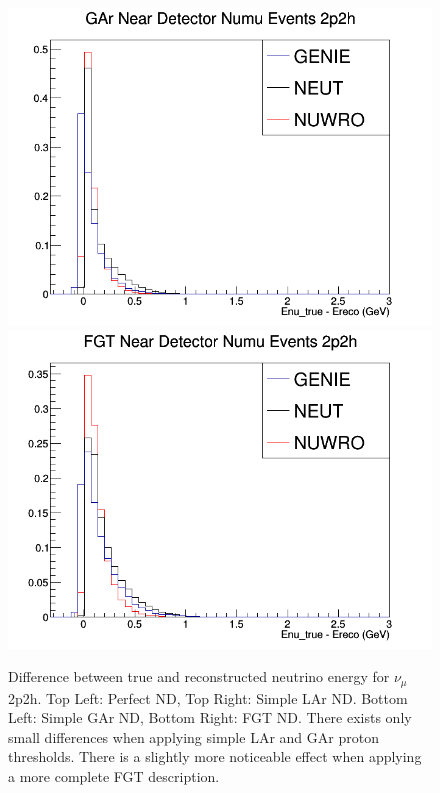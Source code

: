 \documentclass[12pt]{article}
\begin{document}
\begin{figure}[h]
\endminipage
\newline
{}
\includegraphics[width=\linewidth]{Ereco_Etrue/numu_GAr_2p2h.png}
\endminipage
{}
\includegraphics[width=\linewidth]{Ereco_Etrue/numu_FGT_2p2h.png}
\endminipage
\caption{Difference between true and reconstructed neutrino energy for $\nu_\mu$ 2p2h. Top Left: Perfect ND, Top Right: Simple LAr ND. Bottom Left: Simple GAr ND, Bottom Right: FGT ND. There exists only small differences when applying simple LAr and GAr proton thresholds. There is a slightly more noticeable effect when applying a more complete FGT description.}
\label{fig:numu_2p2h_Etrue_ereco_allND}
\end{figure}
\FloatBarrier
\end{document}

